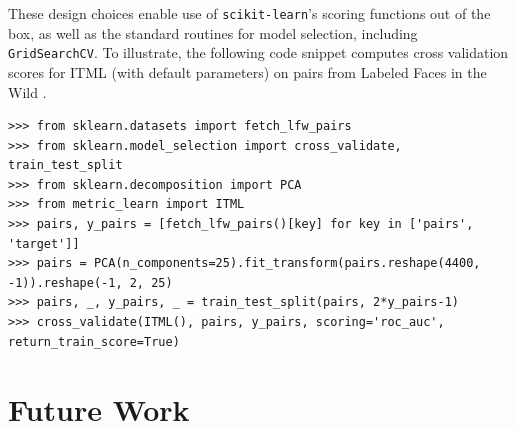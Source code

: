 \documentclass[twoside,11pt]{article}
\newcommand{\aurelien}[1]{\todo[inline,caption={},color=orange!40]{{\it Aurelien:~}#1}}
\newcommand{\william}[1]{\todo[inline,caption={},color=blue!40]{{\it William:~}#1}}
\begin{document}
These design choices enable use of \texttt{scikit-learn}'s scoring functions out of the box, as well as the standard routines for model selection, including \texttt{GridSearchCV}.
To illustrate, the following code snippet computes cross validation scores for ITML (with default parameters) on pairs from Labeled Faces in the Wild \citep{Huang12}.
\begin{verbatim}
>>> from sklearn.datasets import fetch_lfw_pairs 
>>> from sklearn.model_selection import cross_validate, train_test_split 
>>> from sklearn.decomposition import PCA 
>>> from metric_learn import ITML 
>>> pairs, y_pairs = [fetch_lfw_pairs()[key] for key in ['pairs', 'target']]
>>> pairs = PCA(n_components=25).fit_transform(pairs.reshape(4400, -1)).reshape(-1, 2, 25) 
>>> pairs, _, y_pairs, _ = train_test_split(pairs, 2*y_pairs-1)  
>>> cross_validate(ITML(), pairs, y_pairs, scoring='roc_auc', return_train_score=True)
\end{verbatim}


\section{Future Work}
\end{document}
